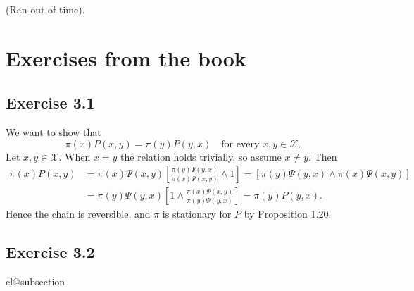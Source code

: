 \documentclass[12pt]{article}
\makeatletter
\def\nullstepcounter#1{%
	\begingroup
		\let\@elt\@stpelt
		\csname cl@#1\endcsname
	\endgroup}
\makeatother
\begin{document}
(Ran out of time).

\section*{Exercises from the book}

\subsection*{Exercise 3.1}

We want to show that
\begin{equation*}
\pi(x) P(x, y) = \pi(y) P(y, x) \quad \text{for every $x, y \in \mathcal{X}$}.
\end{equation*}
Let $x, y \in \mathcal{X}$. When $x = y$ the relation holds trivially, so assume $x \neq y$. Then
\begin{align*}
\pi(x) P(x, y) &= \pi(x) \Psi(x, y) \left[\frac{\pi(y) \Psi(y, x)}{\pi(x) \Psi(x, y)} \wedge 1\right] = [\pi(y) \Psi(y, x) \wedge \pi(x) \Psi(x, y)] \\
&= \pi(y) \Psi(y, x) \left[1 \wedge \frac{\pi(x) \Psi(x, y)}{\pi(y) \Psi(y, x)} \right] = \pi(y) P(y, x).
\end{align*}
Hence the chain is reversible, and $\pi$ is stationary for $P$ by Proposition 1.20.

\subsection*{Exercise 3.2}
\nullstepcounter{subsection}
\end{document}
